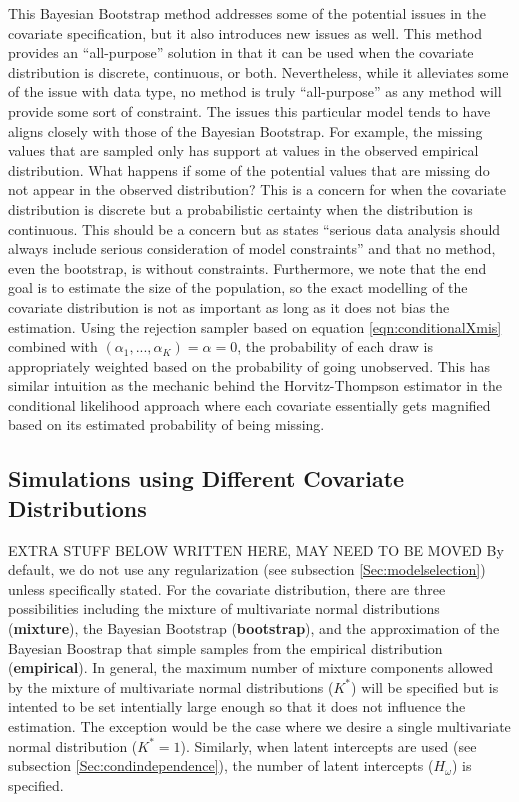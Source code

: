 \documentclass[
  12pt,
]{article}
\begin{document}
This Bayesian Bootstrap method addresses some of the potential issues in
the covariate specification, but it also introduces new issues as well.
This method provides an ``all-purpose'' solution in that it can be used
when the covariate distribution is discrete, continuous, or both.
Nevertheless, while it alleviates some of the issue with data type, no
method is truly ``all-purpose'' as any method will provide some sort of
constraint. The issues this particular model tends to have aligns
closely with those of the Bayesian Bootstrap. For example, the missing
values that are sampled only has support at values in the observed
empirical distribution. What happens if some of the potential values
that are missing do not appear in the observed distribution? This is a
concern for when the covariate distribution is discrete but a
probabilistic certainty when the distribution is continuous. This should
be a concern but as \cite{rubin_bayesian_1981} states ``serious data
analysis should always include serious consideration of model
constraints'' and that no method, even the bootstrap, is without
constraints. Furthermore, we note that the end goal is to estimate the
size of the population, so the exact modelling of the covariate
distribution is not as important as long as it does not bias the
estimation. Using the rejection sampler based on equation
\ref{eqn:conditionalXmis} combined with
\((\alpha_1, ..., \alpha_K) = \alpha = 0\), the probability of each draw
is appropriately weighted based on the probability of going unobserved.
This has similar intuition as the mechanic behind the Horvitz-Thompson
estimator in the conditional likelihood approach where each covariate
essentially gets magnified based on its estimated probability of being
missing.

\subsection{Simulations using Different Covariate Distributions}
\label{Sec:simscovdists}

EXTRA STUFF BELOW WRITTEN HERE, MAY NEED TO BE MOVED By default, we do
not use any regularization (see subsection \ref{Sec:modelselection})
unless specifically stated. For the covariate distribution, there are
three possibilities including the mixture of multivariate normal
distributions (\textbf{mixture}), the Bayesian Bootstrap
(\textbf{bootstrap}), and the approximation of the Bayesian Boostrap
that simple samples from the empirical distribution
(\textbf{empirical}). In general, the maximum number of mixture
components allowed by the mixture of multivariate normal distributions
(\(K^*\)) will be specified but is intented to be set intentially large
enough so that it does not influence the estimation. The exception would
be the case where we desire a single multivariate normal distribution
(\(K^*=1\)). Similarly, when latent intercepts are used (see subsection
\ref{Sec:condindependence}), the number of latent intercepts
(\(H_{\omega}\)) is specified.
\end{document}
